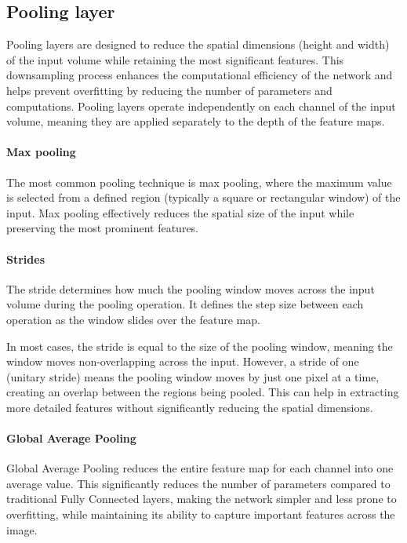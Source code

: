 \subsection{Pooling layer}
Pooling layers are designed to reduce the spatial dimensions (height and width) of the input volume while retaining the most significant features. 
This downsampling process enhances the computational efficiency of the network and helps prevent overfitting by reducing the number of parameters and computations. 
Pooling layers operate independently on each channel of the input volume, meaning they are applied separately to the depth of the feature maps.

\paragraph*{Max pooling}
The most common pooling technique is max pooling, where the maximum value is selected from a defined region (typically a square or rectangular window) of the input. 
Max pooling effectively reduces the spatial size of the input while preserving the most prominent features.

\paragraph*{Strides}
The stride determines how much the pooling window moves across the input volume during the pooling operation. 
It defines the step size between each operation as the window slides over the feature map.

In most cases, the stride is equal to the size of the pooling window, meaning the window moves non-overlapping across the input. 
However, a stride of one (unitary stride) means the pooling window moves by just one pixel at a time, creating an overlap between the regions being pooled.
This can help in extracting more detailed features without significantly reducing the spatial dimensions.

\paragraph*{Global Average Pooling}
Global Average Pooling reduces the entire feature map for each channel into one average value. 
This significantly reduces the number of parameters compared to traditional Fully Connected layers, making the network simpler and less prone to overfitting, while maintaining its ability to capture important features across the image.

